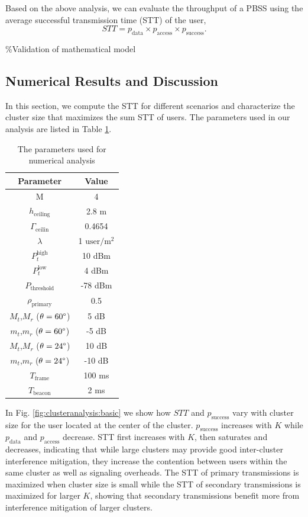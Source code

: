\documentclass[10pt, conference, letterpaper]{IEEEtran}
\begin{document}
Based on the above analysis, we can evaluate the throughput of a PBSS using the average successful transmission time (STT) of the user,
\begin{equation*}
STT = p_{\mathrm{data}}\times p_{\mathrm{access}} \times p_{\mathrm{success}}.
\end{equation*}

\%Validation of mathematical model

\subsection{Numerical Results and Discussion}
In this section, we compute the STT for different scenarios and characterize the cluster size that maximizes the sum STT of users. 
The parameters used in our analysis are listed in Table \ref{tab:clusteranalysis:parameter}.

\begin{table}
	\centering
	\caption{The parameters used for numerical analysis}
	\begin{tabular}{cc}
		\hline
		Parameter & Value \\
		\hline
		M & 4 \\
		$h_{\mathrm{ceiling}}$ & 2.8 m \\
		$\Gamma_{\mathrm{ceilin}}$ & 0.4654 \\
		$\lambda$ & 1 $\mathrm{user/m^2}$ \\
		$P_t^{\mathrm{high}}$ & 10 dBm \\
		$P_t^{\mathrm{low}}$ & 4 dBm \\
		$P_{\mathrm{threshold}}$ & -78 dBm \\
		$\rho_{\mathrm{primary}}$ & 0.5 \\
		$M_t$,$M_r$ ($\theta = 60\degree$) & 5 dB \\
		$m_t$,$m_r$ ($\theta = 60\degree$) & -5 dB \\
		$M_t$,$M_r$ ($\theta = 24\degree$) & 10 dB \\
		$m_t$,$m_r$ ($\theta = 24\degree$) & -10 dB \\		
		$T_{\mathrm{frame}}$ & 100 ms \\
		$T_{\mathrm{beacon}}$ & 2 ms \\
		\hline
	\end{tabular}
	\label{tab:clusteranalysis:parameter}	
\end{table}

In Fig. \ref{fig:clusteranalysis:basic} we show how $STT$ and $p_{\mathrm{success}}$ vary with cluster size for the user located at the center of the cluster.  
$p_{\mathrm{success}}$ increases with $K$ while $p_{\mathrm{data}}$ and $p_{\mathrm{access}}$ decrease. 
STT first increases with $K$, then saturates and decreases, indicating that while large clusters may provide good inter-cluster interference mitigation, they increase the contention between users within the same cluster as well as signaling overheads. 
The STT of primary transmissions is maximized when cluster size is small while the STT of secondary transmissions is maximized for larger $K$, showing that secondary transmissions benefit more from interference mitigation of larger clusters.
\end{document}
